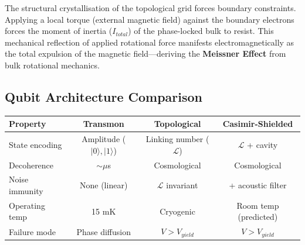 The structural crystallisation of the topological grid forces boundary constraints. Applying a local torque (external magnetic field) against the boundary electrons forces the moment of inertia ($I_{total}$) of the phase-locked bulk to resist. This mechanical reflection of applied rotational force manifests electromagnetically as the total expulsion of the magnetic field---deriving the \textbf{Meissner Effect} from bulk rotational mechanics.

\subsection*{Qubit Architecture Comparison}
\begin{center}
\small
\renewcommand{\arraystretch}{1.2}
\begin{tabular}{lccc}
\toprule
\textbf{Property} & \textbf{Transmon} & \textbf{Topological} & \textbf{Casimir-Shielded} \\
\midrule
State encoding  & Amplitude ($|0\rangle,|1\rangle$) & Linking number ($\mathcal{L}$) & $\mathcal{L}$ + cavity \\
Decoherence     & $\sim\mu$s        & Cosmological           & Cosmological \\
Noise immunity  & None (linear)     & $\mathcal{L}$ invariant & + acoustic filter \\
Operating temp  & 15 mK             & Cryogenic              & Room temp (predicted) \\
Failure mode    & Phase diffusion   & $V > V_{yield}$        & $V > V_{yield}$ \\
\bottomrule
\end{tabular}
\end{center}
